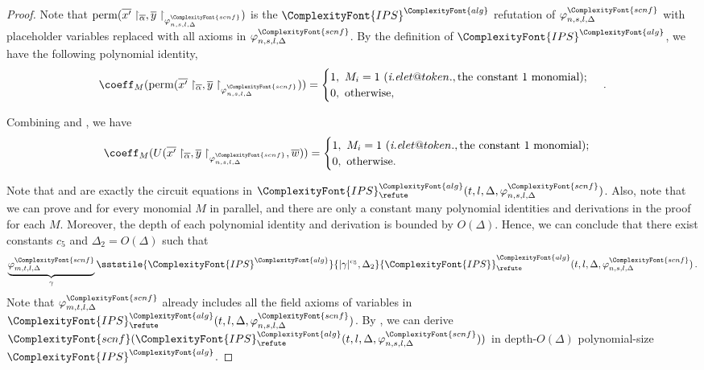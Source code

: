 \documentclass[11pt,letter]{article}
\makeatletter
\theoremstyle{remark} %
\DeclareRobustCommand\onedot{\futurelet\@let@token\@onedot}
\def\@onedot{\ifx\@let@token.\else.\null\fi\xspace}
\def\ie{\emph{i.e}\onedot} \def\Ie{\emph{I.e}\onedot}
\newcommand{\perm}{{\rm perm}}
\newcommand{\alg}{\ComplexityFont{alg}}
\newcommand{\IPS}{%
    {
        \ComplexityFont{IPS} 
    }
}
\newcommand{\scnf}{
    {
        \ComplexityFont{scnf}
    }
}
\makeatother
\begin{document}
{\begin{proof}
        Note that $\perm(\overline{x^\prime}\restriction_{\overline{\alpha}}, \overline{y}\restriction_{\varphi_{n,s,l,\Delta}^\scnf})$ is the $\IPS^\alg$ refutation of $\varphi_{n,s,l,\Delta}^\scnf$ with placeholder variables replaced with all axioms in $\varphi_{n,s,l,\Delta}^\scnf$. By the definition of $\IPS^\alg$, we have the following polynomial identity,
        \begin{equation}
            \label{equa: equation for refutation predicate 4}
            \coeff_M(\perm(\overline{x^\prime}\restriction_{\overline{\alpha}}, \overline{y}\restriction_{\varphi_{n,s,l,\Delta}^\scnf})) 
            =  \begin{cases}
                 1,\ M_i =1  \ (\ie, \text{the constant 1 monomial});\\
                0,\ \text{otherwise},
            \end{cases}\,.
        \end{equation}

        Combining  and , we have
        \begin{equation}
            \label{equa: second half of refutation predicate}
            \coeff_M(U(\overline{x^\prime}\restriction_{\overline{\alpha}},\overline{y}\restriction_{\varphi_{n,s,l,\Delta}^\scnf}, \overline{w})) = \begin{cases}
                 1,\ M_i =1  \ (\ie, \text{the constant 1 monomial});\\
                0,\ \text{otherwise}.
            \end{cases}
        \end{equation}

    
        
        Note that  and  are exactly the circuit equations in $\IPS_\refute^\alg(t,l, \Delta,\varphi_{n,s,l,\Delta}^\scnf)$. Also, note that we can prove  and  for every monomial $M$ in parallel, and there are only a constant many polynomial identities and derivations in the proof for each $M$. Moreover, the depth of each polynomial identity and derivation is bounded by $O(\Delta)$. Hence, we can conclude that there exist constants $c_5$ and $\Delta_2= O(\Delta)$ such that
        \begin{equation}
            \underbrace{\varphi_{m,t,l, \Delta}^\scnf}_{\gamma} \sststile{\IPS^\alg}{|\gamma|^{c_5}, \Delta_2} \IPS_\refute^\alg(t,l,\Delta, \varphi_{n,s,l,\Delta}^\scnf)\,.
        \end{equation}
        Note that $\varphi_{m, t,l,\Delta}^\scnf$ already includes all the field axioms of variables in $ \IPS_\refute^\alg(t,l,\Delta, \varphi_{n,s,l,\Delta}^\scnf)$. By , we can derive $\scnf(\IPS_\refute^\alg(t,l,\Delta, \varphi_{n,s,l,\Delta}^\scnf))$ in depth-$O(\Delta)$ polynomial-size $\IPS^\alg$.
        

\end{proof}}
\end{document}

